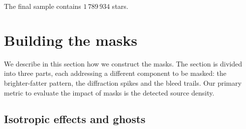 \documentclass[11pt,a4paper,oneside,final]{scrartcl}
\begin{document}
The final sample contains $1\,789\,934$ stars.

\section{Building the masks}
\label{sec:masks}

We describe in this section how we construct the masks. The section is divided into three parts, each addressing a different component to be masked: the brighter-fatter pattern, the diffraction spikes and the bleed trails. Our primary metric to evaluate the impact of masks is the detected source density. 

\subsection{Isotropic effects and ghosts}
\end{document}

